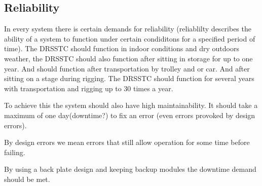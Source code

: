 \subsection{Reliability}
In every system there is certain demands for reliability (reliablilty describes the ability of a system to function under certain condiditons for a specified period of time). The DRSSTC should function in indoor conditions and dry outdoors weather, the DRSSTC should also function after sitting in storage for up to one year. And should function after transportation by trolley and or car. And after sitting on a stage during rigging. The DRSSTC should function for several years with transportation and rigging up to 30 times a year.

To achieve this the system should also have high maintainability. It should take a maximum of one day(downtime?) to fix an error (even errors provoked by design errors).

By design errors we mean errors that still allow operation for some time before failing.

By using a back plate design and keeping backup modules the downtime demand should be met. 
